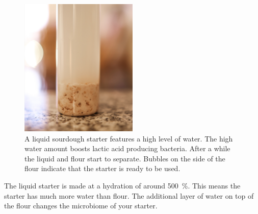 \begin{figure}[!htb]
\begin{center}
  \includegraphics[width=0.5\textwidth]{sourdough-starter-liquid.jpg}
  \caption[Liquid starter]{A liquid sourdough starter features a high level of
      water. The high water amount boosts lactic acid producing bacteria.
      After a while the liquid and flour start to separate. Bubbles on the
      side of the flour indicate that the starter is ready to be used.}%
  \label{fig:liquid-sourdough-starter}
\end{center}
\end{figure}


\begin{flowchart}[!htb]
\begin{center}
  
  \caption[Converting to a liquid starter]{The process to convert your regular
      or stiff starter into a liquid starter. The whole process takes around 3
      days. The longer you maintain your starter at the suggested hydration
      level, the more adapted your microorganisms become. It is recommended to
      keep a backup of your original starter as the liquid environment will
      select anaerobic microorganisms. This boosts bacteria that create lactic
      acid rather than acetic acid. The resulting acidity will be perceived as
      milder.}%
  \label{flc:liquid-starter-conversion}
\end{center}
\end{flowchart}

The liquid starter is made at a hydration of around \qty{500}{\percent}. This means
the starter has much more water than flour. The additional layer of water on
top of the flour changes the microbiome of your starter.

